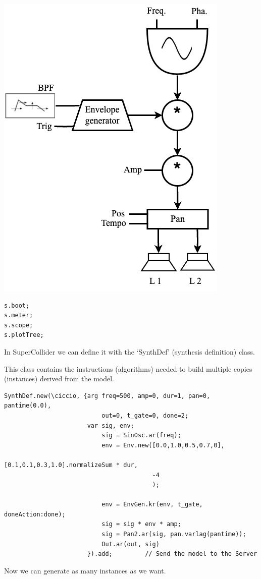 \begin{center}
\includegraphics[scale=0.35]{../img/modello.png}
\end{center}

\begin{lstlisting}[frame=single] 
s.boot;
s.meter;
s.scope;
s.plotTree;
\end{lstlisting}

In SuperCollider we can define it with the `SynthDef' (synthesis definition) class.

This class contains the instructions (algorithms) needed to build multiple copies (instances) derived from the model.

\begin{lstlisting}[frame=single] 
SynthDef.new(\ciccio, {arg freq=500, amp=0, dur=1, pan=0, pantime(0.0), 
                           out=0, t_gate=0, done=2;
                       var sig, env;
                           sig = SinOsc.ar(freq);
                           env = Env.new([0.0,1.0,0.5,0.7,0],                
                                         [0.1,0.1,0.3,1.0].normalizeSum * dur, 
                                         -4    
                                         );

                           env = EnvGen.kr(env, t_gate, doneAction:done);
                           sig = sig * env * amp;
                           sig = Pan2.ar(sig, pan.varlag(pantime));
                           Out.ar(out, sig)
                       }).add;         // Send the model to the Server
\end{lstlisting}
Now we can generate as many instances as we want.

